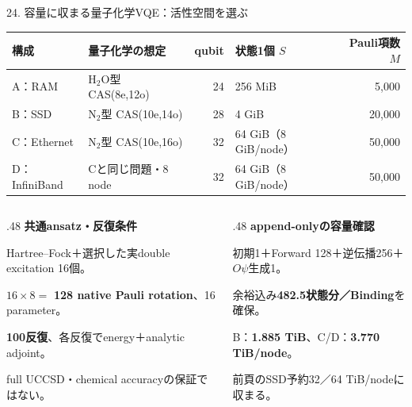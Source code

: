 \begin{frame}{24. 容量に収まる量子化学VQE：活性空間を選ぶ}
  \small
  \begin{tabularx}{\textwidth}{@{}p{}p{}rXr@{}}
    \toprule 構成 & 量子化学の想定 & qubit & 状態1個 $S$ & Pauli項数 $M$ \\
    \midrule
    A：RAM & H$_2$O型 CAS(8e,12o) & 24 & 256 MiB & 5,000 \\
    B：SSD & N$_2$型 CAS(10e,14o) & 28 & 4 GiB & 20,000 \\
    C：Ethernet & N$_2$型 CAS(10e,16o) & 32 & 64 GiB（8 GiB/node） & 50,000 \\
    D：InfiniBand & Cと同じ問題・8 node & 32 & 64 GiB（8 GiB/node） & 50,000 \\
    \bottomrule
  \end{tabularx}
  \medskip
  \begin{columns}[T,onlytextwidth]
    \begin{column}{.48\textwidth}
      \textbf{共通ansatz・反復条件}\par
      \small Hartree--Fock＋選択した実double excitation 16個。\par
      $16\times8=$ \textbf{128 native Pauli rotation}、16 parameter。\par
      \textbf{100反復}、各反復でenergy＋analytic adjoint。\par
      full UCCSD・chemical accuracyの保証ではない。
    \end{column}
    \begin{column}{.48\textwidth}
      \textbf{append-onlyの容量確認}\par
      \small 初期1＋Forward 128＋逆伝播256＋$O\psi$生成1。\par
      余裕込み\textbf{482.5状態分／Binding}を確保。\par
      B：\textbf{1.885 TiB}、C/D：\textbf{3.770 TiB/node}。\par
      前頁のSSD予約32／64 TiB/nodeに収まる。
    \end{column}
  \end{columns}
\end{frame}

